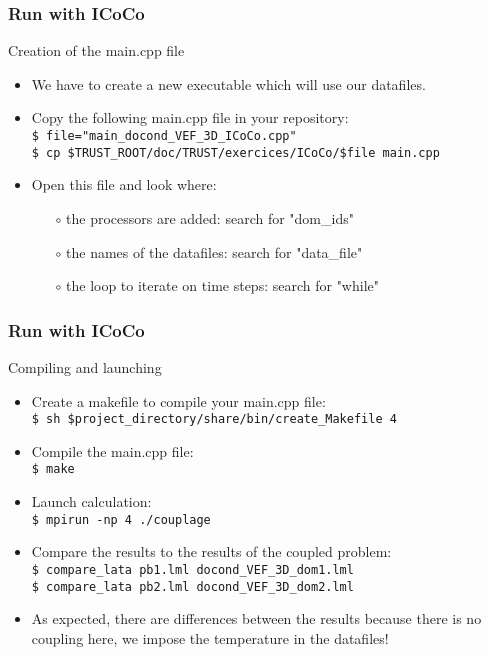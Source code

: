 \documentclass[10pt, hyperref={unicode=true,pdfusetitle, bookmarks=true,bookmarksnumbered=false,bookmarksopen=false, breaklinks=false,pdfborder={0 0 1},backref=true,colorlinks=true,linkcolor=darkblue,pageanchor, urlcolor=darkblue}]{beamer}
\begin{document}
\begin{frame}
\frametitle{Run with ICoCo}



\begin{block}{Creation of the main.cpp file}
\begin{itemize}
\item We have to create a new executable which will use our datafiles.
\item Copy the following main.cpp file in your repository:\\
\texttt{\$ file="main\_docond\_VEF\_3D\_ICoCo.cpp"}\\
\texttt{\$ cp \$TRUST\_ROOT/doc/TRUST/exercices/ICoCo/\$file main.cpp }
\item Open this file and look where:
    \begin{itemize}
    \item [$\circ$] the processors are added: search for "dom\_ids"
    \item [$\circ$] the names of the datafiles: search for "data\_file"
    \item [$\circ$] the loop to iterate on time steps: search for "while"
    \end{itemize}
\end{itemize}
\end{block}

\end{frame}
\begin{frame}
\frametitle{Run with ICoCo}

\begin{block}{Compiling and launching}
\begin{itemize}
\item Create a makefile to compile your main.cpp file:\\
\texttt{\$ sh \$project\_directory/share/bin/create\_Makefile 4}
\item Compile the main.cpp file:\\
\texttt{\$ make}
\item Launch calculation:\\
\texttt{\$ mpirun -np 4 ./couplage}
\item Compare the results to the results of the coupled problem:\\
\texttt{\$ compare\_lata pb1.lml docond\_VEF\_3D\_dom1.lml}\\
\texttt{\$ compare\_lata pb2.lml docond\_VEF\_3D\_dom2.lml}
\item As expected, there are differences between the results because there is no coupling here, we impose the temperature in the datafiles!
\end{itemize}
\end{block}

\end{frame}
\end{document}
